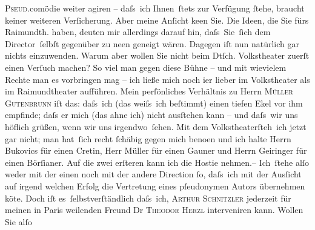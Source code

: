                   \textsc{Pseud.}comödie weiter agiren – daſs ich Ihnen ſtets zur
               Verfügung{ }ſtehe, braucht keiner weiteren Verſicherung. Aber meine Anſicht ke{\geminationn}en Sie.
               Die Ideen, die Sie fürs Raimundth. haben, deuten mir
               allerdings darauf hin, daſs Sie ſich dem Director ſelbſt gegenüber zu ne{\geminationn}en geneigt
               wären. Dagegen iſt nun natürlich gar nichts einzuwenden. Warum aber wollen Sie nicht
               beim Dtſch. Volkstheater zuerſt einen Verſuch machen? So
               viel man gegen diese Bühne – und mit {\pb}wievielem Rechte man
               es vorbringen mag – ich ließe mich noch i{\geminationm}er lieber im Volkstheater als im Raimundtheater aufführen.
               Mein perſönliches Verhältnis zu Herrn \textsc{Müller Gutenbrunn} iſt das: daſs ich (das weiſs ich beſtimmt) einen tiefen Ekel vor ihm empfinde;
               daſs er mich (das ahne ich) nicht ausſtehen kann – und daſs wir uns höflich grüßen,
               wenn wir uns irgendwo ſehen. Mit dem Volkstheaterſteh ich
               jetzt gar nicht; man hat ſich recht{ }ſchäbig gegen mich beno{\geminationm}en und ich halte {\pb}Herrn Bukovics für einen
               Cretin, Herr Müller für einen Gauner und Herrn Geiringer für einen Börſianer. Auf die zwei erſteren
               kann ich die Hostie nehmen.– Ich ſtehe alſo weder mit der einen noch mit der andere
               Direction{ }ſo, daſs ich mit der Ausſicht auf irgend welchen Erfolg die Vertretung
               eines pſeudonymen Autors übernehmen kö{\geminationn}te. Doch iſt es ſelbstverſtändlich daſs ich,
                  \textsc{Arthur Schnitzler} jederzeit für meinen in Paris weilenden Freund Dr \textsc{Theodor {\pb}Herzl} interveniren kann. Wollen Sie alſo
